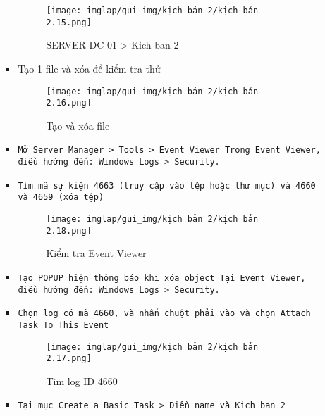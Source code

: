 \documentclass[13pt]{article}
\begin{document}
\begin{enumerate}
\begin{itemize}
\begin{itemize}
                    \begin{figure}[H]
                        \centering
                        \texttt{[image: imglap/gui\_img/kịch bản 2/kịch bản 2.15.png]}
                        \caption{SERVER-DC-01 > Kich ban 2}
                        \label{fig:enter-label}
                    \end{figure}
\newpage
                    \item Tạo 1 file và xóa để kiểm tra thử
                    \begin{figure}[H]
                        \centering
                        \texttt{[image: imglap/gui\_img/kịch bản 2/kịch bản 2.16.png]}
                        \caption{Tạo và xóa file}
                        \label{fig:enter-label}
                    \end{figure}
                    \item \texttt{Mở Server Manager > Tools > Event Viewer Trong Event Viewer, điều hướng đến: Windows Logs > Security.}
                    \item \texttt{Tìm mã sự kiện 4663 (truy cập vào tệp hoặc thư mục) và 4660 và 4659 (xóa tệp)}
                    \begin{figure}[H]
                        \centering
                        \texttt{[image: imglap/gui\_img/kịch bản 2/kịch bản 2.18.png]}
                        \caption{Kiểm tra Event Viewer}
                        \label{fig:enter-label}
                    \end{figure}
                    \item \texttt{Tạo POPUP hiện thông báo khi xóa object Tại Event Viewer, điều hướng đến: Windows Logs > Security.}
                    \item \texttt{Chọn log có mã 4660, và nhấn chuột phải vào và chọn Attach Task To This Event}
                    \begin{figure}[H]
                        \centering
                        \texttt{[image: imglap/gui\_img/kịch bản 2/kịch bản 2.17.png]}
                        \caption{Tìm log ID 4660}
                        \label{fig:enter-label}
                    \end{figure}
                    \item \texttt{Tại mục Create a Basic Task > Điền name và Kich ban 2}
                    \begin{figure}[H]
 		\hfill

\end{figure}
\end{itemize}
\end{itemize}
\end{enumerate}
\end{document}
